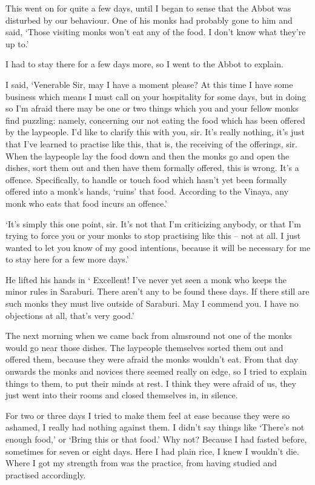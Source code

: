 This went on for quite a few days, until I began to sense that the Abbot was disturbed by our behaviour. One of his monks had probably gone to him and said, `Those visiting monks won't eat any of the food. I don't know what they're up to.'

I had to stay there for a few days more, so I went to the Abbot to explain.

I said, `Venerable Sir, may I have a moment please? At this time I have some business which means I must call on your hospitality for some days, but in doing so I'm afraid there may be one or two things which you and your fellow monks find puzzling: namely, concerning our not eating the food which has been offered by the laypeople. I'd like to clarify this with you, sir. It's really nothing, it's just that I've learned to practise like this, that is, the receiving of the offerings, sir. When the laypeople lay the food down and then the monks go and open the dishes, sort them out and then have them formally offered, this is wrong. It's a  offence. Specifically, to handle or touch food which hasn't yet been formally offered into a monk's hands, `ruins' that food. According to the Vinaya, any monk who eats that food incurs an offence.'

`It's simply this one point, sir. It's not that I'm criticizing anybody, or that I'm trying to force you or your monks to stop practising like this -- not at all. I just wanted to let you know of my good intentions, because it will be necessary for me to stay here for a few more days.'

He lifted his hands in  ` Excellent! I've never yet seen a monk who keeps the minor rules in Saraburi. There aren't any to be found these days. If there still are such monks they must live outside of Saraburi. May I commend you. I have no objections at all, that's very good.'

The next morning when we came back from almsround not one of the monks would go near those dishes. The laypeople themselves sorted them out and offered them, because they were afraid the monks wouldn't eat. From that day onwards the monks and novices there seemed really on edge, so I tried to explain things to them, to put their minds at rest. I think they were afraid of us, they just went into their rooms and closed themselves in, in silence.

For two or three days I tried to make them feel at ease because they were so ashamed, I really had nothing against them. I didn't say things like `There's not enough food,' or `Bring this or that food.' Why not? Because I had fasted before, sometimes for seven or eight days. Here I had plain rice, I knew I wouldn't die. Where I got my strength from was the practice, from having studied and practised accordingly.

